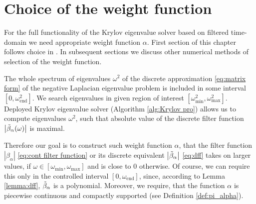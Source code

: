 \documentclass[a4paper,11pt,bibliography=totoc,listof=totoc,headinclude=true,cleardoublepage=empty,oneside]{scrbook}
\newcommand{\dff}{\Tilde{\beta}_\alpha}
\newcommand{\e}{\mathrm{end}}
\begin{document}
\chapter{Choice of the weight function}
\label{chapter:function}
For the full functionality of the Krylov eigenvalue solver based on filtered time-domain we need appropriate weight function $\alpha$. First section of this chapter follows choice in \cite{nannen}. In subsequent sections we discuss other numerical methods of selection of the weight function.

The whole spectrum of eigenvalues $\omega^2$ of the discrete approximation \eqref{eq:matrix form} of the negative Laplacian eigenvalue problem is included in some interval $\left[0, \omega_\e^2\right]$. We search eigenvalues in given region of interest $\left[\omega_{\min}^2, \omega_{\max}^2\right]$. Deployed Krylov eigenvalue solver (Algorithm \ref{alg:Krylov pro}) allows us to compute eigenvalues $\omega^2$, such that absolute value of the discrete filter function $\left|\dff(\omega)\right|$ is maximal. 

Therefore our goal is to construct such weight function $\alpha$, that the filter function $\left|\beta_\alpha\right|$ \eqref{eq:cont filter function} or its discrete equivalent $\left|\dff\right|$ \eqref{eq:dff} takes on larger values, if $\omega \in \left[\omega_{\min}, \omega_{\max} \right]$ and is close to 0 otherwise. Of course, we can require this only in the controlled interval $\left[0, \omega_\e\right]$, since, according to Lemma \ref{lemma:dff}, $\dff$ is a polynomial. Moreover, we require, that the function $\alpha$ is piecewise continuous and compactly supported (see Definition \ref{def:pi_alpha}).
\end{document}
